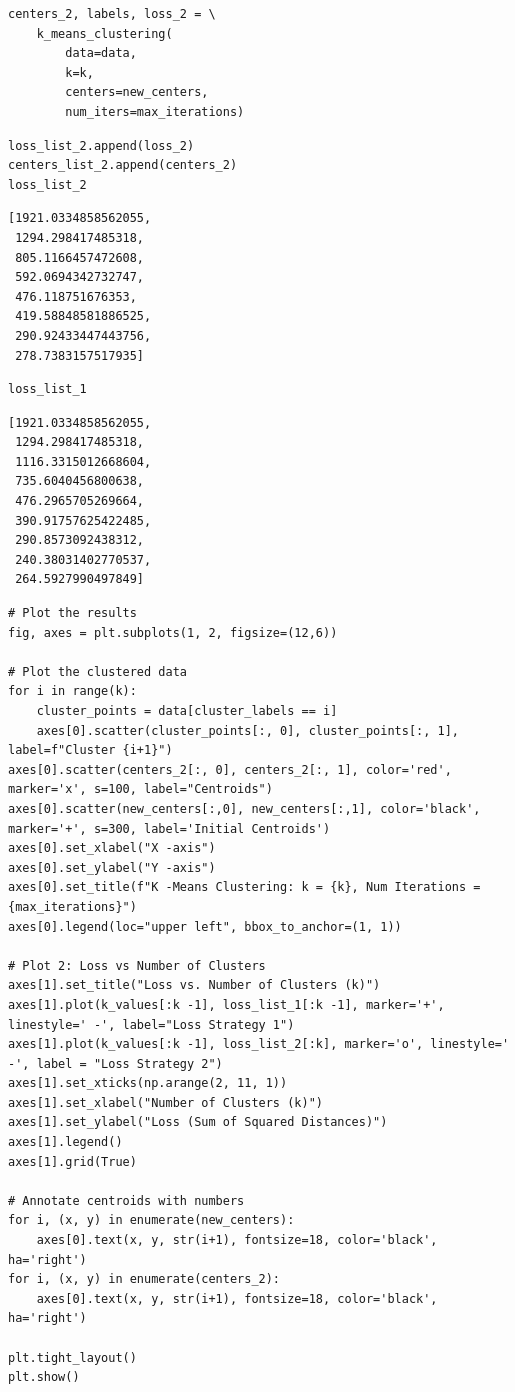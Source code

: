 \begin{verbatim}
centers_2, labels, loss_2 = \
    k_means_clustering(
        data=data,
        k=k,
        centers=new_centers,
        num_iters=max_iterations)
\end{verbatim}

\begin{verbatim}
loss_list_2.append(loss_2)
centers_list_2.append(centers_2)
loss_list_2
\end{verbatim}

\begin{verbatim}
[1921.0334858562055,
 1294.298417485318,
 805.1166457472608,
 592.0694342732747,
 476.118751676353,
 419.58848581886525,
 290.92433447443756,
 278.7383157517935]
\end{verbatim}

\begin{verbatim}
loss_list_1
\end{verbatim}

\begin{verbatim}
[1921.0334858562055,
 1294.298417485318,
 1116.3315012668604,
 735.6040456800638,
 476.2965705269664,
 390.91757625422485,
 290.8573092438312,
 240.38031402770537,
 264.5927990497849]
\end{verbatim}

\begin{verbatim}
# Plot the results
fig, axes = plt.subplots(1, 2, figsize=(12,6))

# Plot the clustered data
for i in range(k):
    cluster_points = data[cluster_labels == i]
    axes[0].scatter(cluster_points[:, 0], cluster_points[:, 1], label=f"Cluster {i+1}")
axes[0].scatter(centers_2[:, 0], centers_2[:, 1], color='red', marker='x', s=100, label="Centroids")
axes[0].scatter(new_centers[:,0], new_centers[:,1], color='black', marker='+', s=300, label='Initial Centroids')
axes[0].set_xlabel("X -axis")
axes[0].set_ylabel("Y -axis")
axes[0].set_title(f"K -Means Clustering: k = {k}, Num Iterations = {max_iterations}")
axes[0].legend(loc="upper left", bbox_to_anchor=(1, 1))

# Plot 2: Loss vs Number of Clusters
axes[1].set_title("Loss vs. Number of Clusters (k)")
axes[1].plot(k_values[:k -1], loss_list_1[:k -1], marker='+', linestyle=' -', label="Loss Strategy 1")
axes[1].plot(k_values[:k -1], loss_list_2[:k], marker='o', linestyle=' -', label = "Loss Strategy 2")
axes[1].set_xticks(np.arange(2, 11, 1))
axes[1].set_xlabel("Number of Clusters (k)")
axes[1].set_ylabel("Loss (Sum of Squared Distances)")
axes[1].legend()
axes[1].grid(True)

# Annotate centroids with numbers
for i, (x, y) in enumerate(new_centers):
    axes[0].text(x, y, str(i+1), fontsize=18, color='black', ha='right')
for i, (x, y) in enumerate(centers_2):
    axes[0].text(x, y, str(i+1), fontsize=18, color='black', ha='right')

plt.tight_layout()
plt.show()
\end{verbatim}

